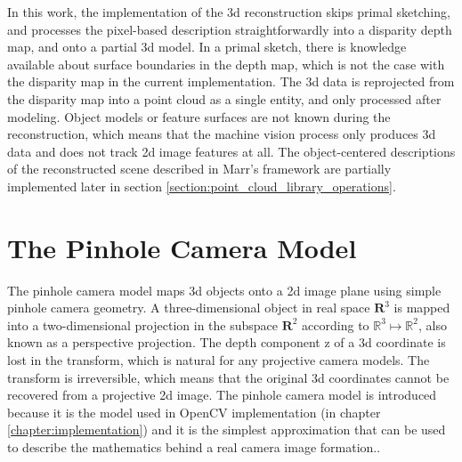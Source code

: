 \documentclass[12pt,a4paper,oneside,pdftex]{report}
\begin{document}
{In this work, the implementation of the 3d reconstruction skips primal sketching, and processes the pixel-based description straightforwardly into a disparity depth map, and onto a partial 3d model. In a primal sketch, there is knowledge available about surface boundaries in the depth map, which is not the case with the disparity map in the current implementation. The 3d data is reprojected from the disparity map into a point cloud as a single entity, and only processed after modeling. Object models or feature surfaces are not known during the reconstruction, which means that the machine vision process only produces 3d data and does not track 2d image features at all. The object-centered descriptions of the reconstructed scene described in Marr's framework are partially implemented later in section \ref{section:point_cloud_library_operations}.

\section{The Pinhole Camera Model}
\label{section:the_pinhole_camera_model}

The pinhole camera model maps 3d objects onto a 2d image plane using simple pinhole camera geometry. A three-dimensional object in real space $\mathbf{R}^3$ is mapped into a two-dimensional projection in the subspace $\mathbf{R}^2$ according to $\mathbb{R}^3 \mapsto \mathbb{R}^2$, also known as a perspective projection. The depth component z of a 3d coordinate is lost in the transform, which is natural for any projective camera models. The transform is irreversible, which means that the original 3d coordinates cannot be recovered from a projective 2d image. The pinhole camera model is introduced because it is the model used in OpenCV implementation (in chapter \ref{chapter:implementation}) and it is the simplest approximation that can be used to describe the mathematics behind a real camera image formation.\citep{Sonka07, OpenCVWeb}.

}
\end{document}
